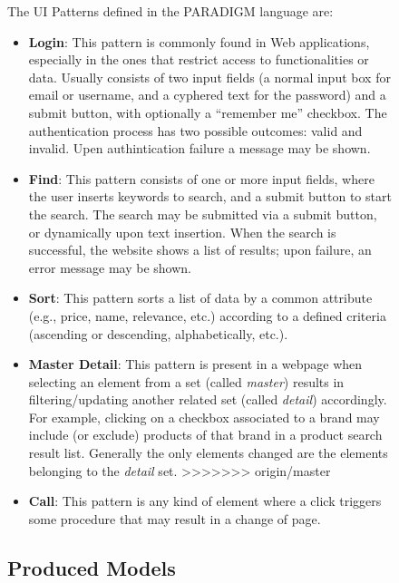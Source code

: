 \documentclass[conference]{IEEEtran}
\begin{document}
\begin{enumerate}
\begin{figure}[!htb]
\begin{itemize}
The UI Patterns defined in the PARADIGM language are:
\begin{itemize}
\item \textbf{Login}: This pattern is commonly found in Web applications, especially in the ones that restrict access to functionalities or data. Usually consists of two input fields (a normal input box for email or username, and a cyphered text for the password) and a submit button, with optionally a ``remember me'' checkbox. The authentication process has two possible outcomes: valid and invalid. Upen authintication failure a message may be shown. 
\item \textbf{Find}: This pattern consists of one or more input fields, where the user inserts keywords to search, and a submit button to start the search. The search may be submitted via a submit button, or dynamically upon text insertion. When the search is successful, the website shows a list of results; upon failure, an error message may be shown.
\item \textbf{Sort}: This pattern sorts a list of data by a common attribute (e.g., price, name, relevance, etc.) according to a defined criteria (ascending or descending, alphabetically, etc.).
\item \textbf{Master Detail}: This pattern is present in a webpage when selecting an element from a set (called \textit{master}) results in filtering/updating another related set (called \textit{detail}) accordingly. For example, clicking on a checkbox associated to a brand may include (or exclude) products of that brand in a product search result list. Generally the only elements changed are the elements belonging to the \textit{detail} set.
>>>>>>> origin/master
\item \textbf{Call}: This pattern is any kind of element where a click triggers some procedure that may result in a change of page.
\end{itemize}

\subsection{Produced Models}


\end{itemize}
\end{figure}
\end{enumerate}
\end{document}

